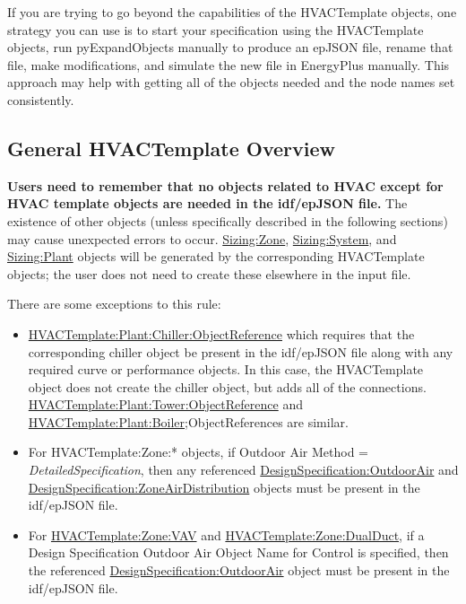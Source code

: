 If you are trying to go beyond the capabilities of the HVACTemplate objects, one strategy you can use is to start your specification using the HVACTemplate objects, run pyExpandObjects manually to produce an epJSON file, rename that file, make modifications, and simulate the new file in EnergyPlus manually. This approach may help with getting all of the objects needed and the node names set consistently.

\subsection{General HVACTemplate Overview}
\textbf{Users need to remember that no objects related to HVAC except for HVAC template objects are needed in the idf/epJSON file.} The existence of other objects (unless specifically described in the following sections) may cause unexpected errors to occur. \hyperref[sizingzone]{Sizing:Zone}, \hyperref[sizingsystem]{Sizing:System}, and \hyperref[sizingplant]{Sizing:Plant} objects will be generated by the corresponding HVACTemplate objects; the user does not need to create these elsewhere in the input file.

There are some exceptions to this rule:

\begin{itemize}
\item
  \hyperref[hvactemplateplantchillerobjectreference]{HVACTemplate:Plant:Chiller:ObjectReference} which requires that the corresponding chiller object be present in the idf/epJSON file along with any required curve or performance objects. In this case, the HVACTemplate object does not create the chiller object, but adds all of the connections. \hyperref[hvactemplateplanttowerobjectreference]{HVACTemplate:Plant:Tower:ObjectReference} and \hyperref[hvactemplateplantboiler]{HVACTemplate:Plant:Boiler};ObjectReferences are similar.
\item
  For HVACTemplate:Zone:* objects, if Outdoor Air Method = \emph{DetailedSpecification}, then any referenced \hyperref[designspecificationoutdoorair]{DesignSpecification:OutdoorAir} and \hyperref[designspecificationzoneairdistribution]{DesignSpecification:ZoneAirDistribution} objects must be present in the idf/epJSON file.
\item
  For \hyperref[hvactemplatezonevav]{HVACTemplate:Zone:VAV} and \hyperref[hvactemplatezonedualduct]{HVACTemplate:Zone:DualDuct}, if a Design Specification Outdoor Air Object Name for Control is specified, then the referenced \hyperref[designspecificationoutdoorair]{DesignSpecification:OutdoorAir} object must be present in the idf/epJSON file.
\end{itemize}

